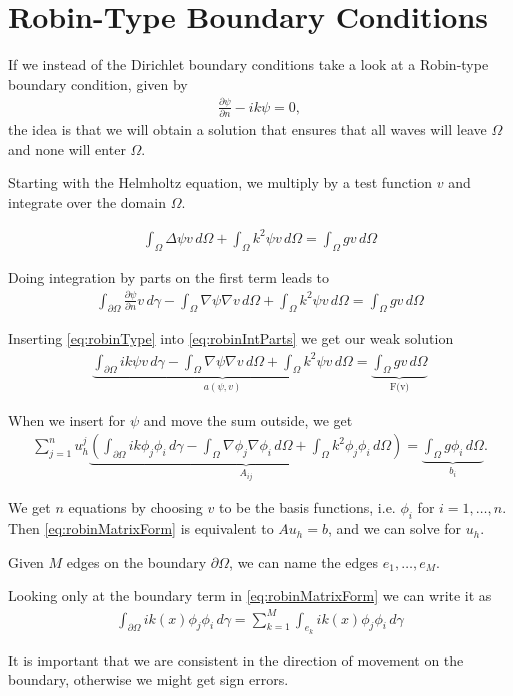 \documentclass[10pt,a4paper]{article}
\begin{document}
\section*{Robin-Type Boundary Conditions}
If we instead of the Dirichlet boundary conditions take a look at a Robin-type boundary condition, given by
\begin{align}\label{eq:robinType}
\frac{\partial \psi}{\partial n} - ik\psi = 0,
\end{align}
the idea is that we will obtain a solution that ensures that all waves will leave $\Omega$ and none will enter $\Omega$.

Starting with the Helmholtz equation, we multiply by a test function $v$ and integrate over the domain $\Omega$. 

\begin{align}
\int_\Omega \Delta \psi v \, d\Omega + \int_\Omega k^2 \psi v \, d\Omega = \int_\Omega gv \, d\Omega
\end{align}

Doing integration by parts on the first term leads to
\begin{align}\label{eq:robinIntParts}
\int_{\partial \Omega} \frac{\partial \psi}{\partial n} v \, d\gamma - \int_\Omega \nabla \psi \nabla v \, d\Omega + \int_\Omega k^2 \psi v \, d\Omega = \int_\Omega gv \, d\Omega
\end{align}

Inserting \eqref{eq:robinType} into \eqref{eq:robinIntParts} we get our weak solution
\begin{align}\label{eq:robinWeakSol}
\underbrace{\int_{\partial \Omega} ik\psi v \, d\gamma - \int_\Omega \nabla \psi \nabla v \, d\Omega + \int_\Omega k^2 \psi v \, d\Omega} _\text{$a(\psi, v)$} = \underbrace{\int_\Omega gv \, d\Omega} _\text{F(v)}
\end{align}

When we insert for $\psi$ and move the sum outside, we get
\begin{align}\label{eq:robinMatrixForm}
\sum_{j=1}^n u_h^j \underbrace{\left( \int_{\partial \Omega} ik\phi_j \phi_i \, d\gamma - \int_\Omega \nabla \phi_j \nabla \phi_i \, d\Omega + \int_\Omega k^2 \phi_j \phi_i \, d\Omega \right)} _\text{$A_{ij}$} = \underbrace{\int_{\Omega} g\phi_i \, d\Omega} _\text{$b_i$}.
\end{align}

We get $n$ equations by choosing $v$ to be the basis functions, i.e. $\phi_i$ for $i = 1, \dots, n$. Then \eqref{eq:robinMatrixForm} is equivalent to $A u_h = b$, and we can solve for $u_h$.

Given $M$ edges on the boundary $\partial \Omega$, we can name the edges $e_1, \dots, e_M$. 

Looking only at the boundary term in \eqref{eq:robinMatrixForm} we can write it as
\begin{align}
\int_{\partial \Omega} ik(x)\phi_j \phi_i \, d\gamma = \sum_{k=1}^M \int_{e_k} ik(x)\phi_j \phi_i \, d\gamma
\end{align}

It is important that we are consistent in the direction of movement on the boundary, otherwise we might get sign errors.
\end{document}
